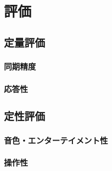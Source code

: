 \chapter{評価}
\label{ch:evaluation}

\section{定量評価}

\subsection{同期精度}

\subsection{応答性}

\section{定性評価}

\subsection{音色・エンターテイメント性}

\subsection{操作性}

